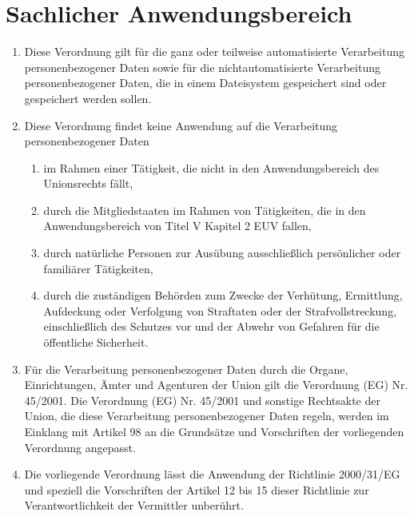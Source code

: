 \chapter{Sachlicher Anwendungsbereich}
\label{ch:02}


\begin{enumerate}

  \item Diese Verordnung gilt für die ganz oder teilweise automatisierte Verarbeitung personenbezogener Daten sowie für
   die nichtautomatisierte Verarbeitung personenbezogener Daten, die in einem Dateisystem gespeichert sind oder
   gespeichert werden sollen.

  \item Diese Verordnung findet keine Anwendung auf die Verarbeitung personenbezogener Daten

  \begin{enumerate}
  
    \item im Rahmen einer Tätigkeit, die nicht in den Anwendungsbereich des Unionsrechts fällt,

    \item durch die Mitgliedstaaten im Rahmen von Tätigkeiten, die in den Anwendungsbereich von Titel V Kapitel 2 EUV
     fallen,

    \item durch natürliche Personen zur Ausübung ausschließlich persönlicher oder familiärer Tätigkeiten,

    \item durch die zuständigen Behörden zum Zwecke der Verhütung, Ermittlung, Aufdeckung oder Verfolgung von Straftaten
     oder der Strafvollstreckung, einschließlich des Schutzes vor und der Abwehr von Gefahren für die öffentliche
     Sicherheit.

  \end{enumerate}

  \item Für die Verarbeitung personenbezogener Daten durch die Organe, Einrichtungen, Ämter und Agenturen der Union gilt
   die Verordnung (EG) Nr. 45/2001. Die Verordnung (EG) Nr. 45/2001 und sonstige Rechtsakte der Union, die diese
   Verarbeitung personenbezogener Daten regeln, werden im Einklang mit Artikel 98 an die Grundsätze und Vorschriften
   der vorliegenden Verordnung angepasst.

  \item Die vorliegende Verordnung lässt die Anwendung der Richtlinie 2000/31/EG und speziell die Vorschriften der
   Artikel 12 bis 15 dieser Richtlinie zur Verantwortlichkeit der Vermittler unberührt.

\end{enumerate}


